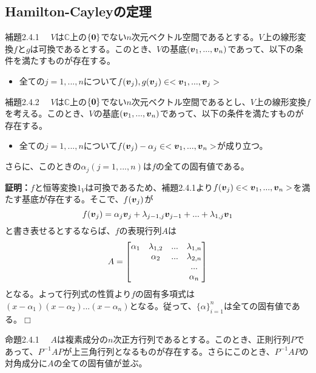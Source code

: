 \documentclass[dvipdfmx, 9pt, a4paper]{jsarticle}
\numberwithin{equation}{subsection}
\newcommand{\bm}[1]{{\mbox{\boldmath $#1$}}}
\def\qed{\hfill $\Box$}
\begin{document}
\subsection{Hamilton-Cayleyの定理}
\begin{itembox}[l]{補題2.4.1}
　$V$は$\mathbb{C}$上の$\{\bm 0\}$でない$n$次元ベクトル空間であるとする。$V$上の線形変換$f$と$g$は可換であるとする。このとき、$V$の基底$(\bm v_1, ..., \bm v_n)$であって、以下の条件を満たすものが存在する。
\begin{itemize}
\item 全ての$j=1, ..., n$について$f(\bm v_j), g(\bm v_j) \in <\bm v_1, ..., \bm v_j>$
\end{itemize}
\end{itembox}
\begin{itembox}[l]{補題2.4.2}
　$V$は$\mathbb{C}$上の$\{\bm 0\}$でない$n$次元ベクトル空間であるとし、$V$上の線形変換$f$を考える。このとき、$V$の基底$(\bm v_1, ..., \bm v_n)$であって、以下の条件を満たすものが存在する。
\begin{itemize}
\item 全ての$j=1, ..., n$について$f(\bm v_j)-\alpha_j \in <\bm v_1, ..., \bm v_n>$が成り立つ。
\end{itemize}
さらに、このときの$\alpha_j(j=1, ..., n)$は$f$の全ての固有値である。
\end{itembox}
{\bf 証明：}$f$と恒等変換$1_V$は可換であるため、補題2.4.1より$f(\bm v_j) \in <\bm v_1, ..., \bm v_n>$を満たす基底が存在する。そこで、$f(\bm v_j)$が
\begin{equation}
f(\bm v_j)=\alpha_j \bm v_j + \lambda_{j-1, j}\bm v_{j-1}+ ... + \lambda_{1, j}\bm v_1 \notag
\end{equation}
と書き表せるとするならば、$f$の表現行列$A$は
\begin{equation}
A=
\begin{bmatrix}
\alpha_1 & \lambda_{1, 2} & ... & \lambda_{1, n} \\
 & \alpha_2 & ... & \lambda_{2, n} \\
 &  &  & ... \\
 &  &  & \alpha_{n} \\
\end{bmatrix} \notag
\end{equation}
となる。よって行列式の性質より$f$の固有多項式は$(x-\alpha_1)(x-\alpha_2)...(x-\alpha_n)$となる。従って、$\{\alpha\}_{i=1}^n$は全ての固有値である。\qed
\begin{itembox}[l]{命題2.4.1}
　$A$は複素成分の$n$次正方行列であるとする。このとき、正則行列$P$であって、$P^{-1}AP$が上三角行列となるものが存在する。さらにこのとき、$P^{-1}AP$の対角成分に$A$の全ての固有値が並ぶ。
\end{itembox}
\end{document}
